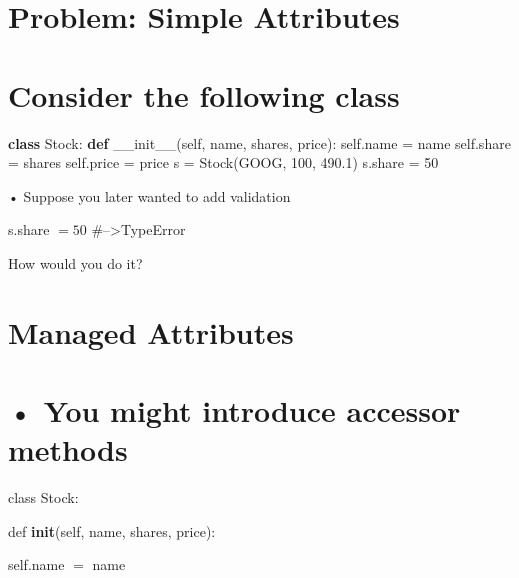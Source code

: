 \documentclass[
  letterpaper,
  DIV=11,
  numbers=noendperiod]{scrreprt}
\newenvironment{Shaded}{\begin{snugshade}}{\end{snugshade}}
\newcommand{\DecValTok}[1]{\textcolor[rgb]{0.68,0.00,0.00}{#1}}
\newcommand{\FloatTok}[1]{\textcolor[rgb]{0.68,0.00,0.00}{#1}}
\newcommand{\FunctionTok}[1]{\textcolor[rgb]{0.28,0.35,0.67}{#1}}
\newcommand{\KeywordTok}[1]{\textcolor[rgb]{0.00,0.23,0.31}{\textbf{#1}}}
\newcommand{\NormalTok}[1]{\textcolor[rgb]{0.00,0.23,0.31}{#1}}
\newcommand{\OperatorTok}[1]{\textcolor[rgb]{0.37,0.37,0.37}{#1}}
\newcommand{\StringTok}[1]{\textcolor[rgb]{0.13,0.47,0.30}{#1}}
\newcommand{\VariableTok}[1]{\textcolor[rgb]{0.07,0.07,0.07}{#1}}
\begin{document}

\chapter{Problem: Simple Attributes}\label{problem-simple-attributes}


\chapter{Consider the following
class}\label{consider-the-following-class}

\begin{Shaded}
\begin{Highlighting}[]
\KeywordTok{class}\NormalTok{ Stock: }\KeywordTok{def} \FunctionTok{\_\_init\_\_}\NormalTok{(}\VariableTok{self}\NormalTok{, name, shares, price): }\VariableTok{self}\NormalTok{.name }\OperatorTok{=}\NormalTok{ name }\VariableTok{self}\NormalTok{.share }\OperatorTok{=}\NormalTok{ shares }\VariableTok{self}\NormalTok{.price }\OperatorTok{=}\NormalTok{ price s }\OperatorTok{=}\NormalTok{ Stock(}\StringTok{\textquotesingle{}GOOG\textquotesingle{}}\NormalTok{, }\DecValTok{100}\NormalTok{, }\FloatTok{490.1}\NormalTok{) s.share }\OperatorTok{=} \DecValTok{50} 
\end{Highlighting}
\end{Shaded}

• Suppose you later wanted to add validation

s.share \(= 50\) \#--\textgreater TypeError

How would you do it?


\chapter{Managed Attributes}\label{managed-attributes}


\chapter{• You might introduce accessor
methods}\label{you-might-introduce-accessor-methods}

class Stock:

def \textbf{init}(self, name, shares, price):

self.name \(=\) name
\end{document}
